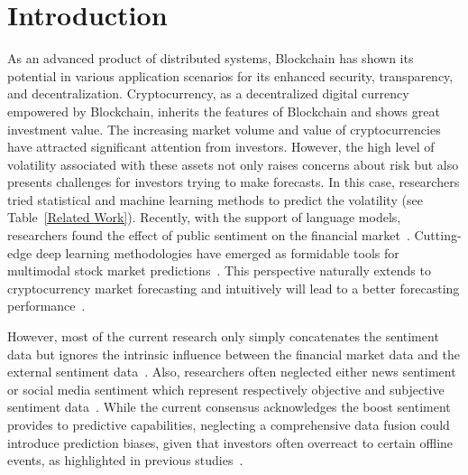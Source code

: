 \section{Introduction}
As an advanced product of distributed systems, Blockchain has shown its potential in various application scenarios for its enhanced security, transparency, and decentralization. Cryptocurrency, as a decentralized digital currency empowered by Blockchain, inherits the features of Blockchain and shows great investment value. The increasing market volume and value of cryptocurrencies have attracted significant attention from investors. However, the high level of volatility associated with these assets not only raises concerns about risk but also presents challenges for investors trying to make forecasts. In this case, researchers tried statistical and machine learning methods to predict the volatility (see Table~\ref{Related Work}). Recently, with the support of language models, researchers found the effect of public sentiment on the financial market~\cite{li2020multimodal}. Cutting-edge deep learning methodologies have emerged as formidable tools for multimodal stock market predictions~\cite{bhatt2023machine,sardelich2018multimodalstock,shin2019deep,zhang2018improving}. This perspective naturally extends to cryptocurrency market forecasting and intuitively will lead to a better forecasting performance~\cite{anamika2023does,sapkota2022news}.

However, most of the current research only simply concatenates the sentiment data but ignores the intrinsic influence between the financial market data and the external sentiment data~\cite{raju2020real,parekh2022dl}. Also, researchers often neglected either news sentiment or social media sentiment which represent respectively objective and subjective sentiment data~\cite{abraham2018cryptocurrency,kraaijeveld2020predictive,rognone2020news,huy2019predicting}. While the current consensus acknowledges the boost sentiment provides to predictive capabilities, neglecting a comprehensive data fusion could introduce prediction biases, given that investors often overreact to certain offline events, as highlighted in previous studies~\cite{fu2022ai,antweiler2006us}. 


